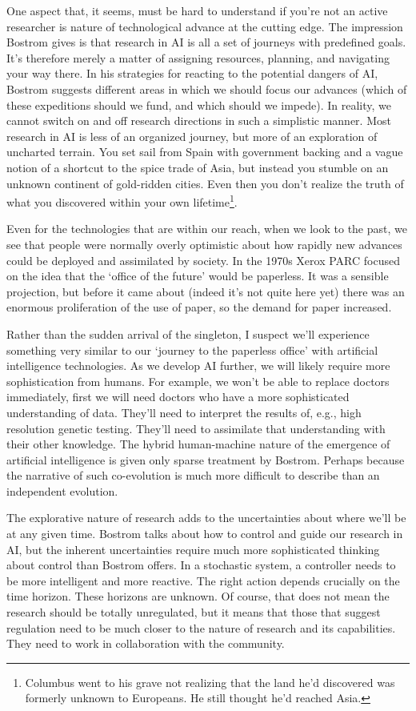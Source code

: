 \documentclass[a4paper]{caesar_book}
\begin{document}
One aspect that, it seems, must be hard to understand if you’re not an active researcher is nature of technological advance at the cutting edge. The impression Bostrom gives is that research in AI is all a set of journeys with predefined goals. It’s therefore merely a matter of assigning resources, planning, and navigating your way there. In his strategies for reacting to the potential dangers of AI, Bostrom suggests different areas in which we should focus our advances (which of these expeditions should we fund, and which should we impede). In reality, we cannot switch on and off research directions in such a simplistic manner. Most research in AI is less of an organized journey, but more of an exploration of uncharted terrain. You set sail from Spain with government backing and a vague notion of a shortcut to the spice trade of Asia, but instead you stumble on an unknown continent of gold-ridden cities. Even then you don’t realize the truth of what you discovered within your own lifetime\footnote{Columbus went to his grave not realizing that the land he’d discovered was formerly unknown to Europeans. He still thought he’d reached Asia.}.

Even for the technologies that are within our reach, when we look to the past, we see that people were normally overly optimistic about how rapidly new advances could be deployed and assimilated by society. In the 1970s Xerox PARC focused on the idea that the ‘office of the future’ would be paperless. It was a sensible projection, but before it came about (indeed it’s not quite here yet) there was an enormous proliferation of the use of paper, so the demand for paper increased.

Rather than the sudden arrival of the singleton, I suspect we’ll experience something very similar to our ‘journey to the paperless office’ with artificial intelligence technologies. As we develop AI further, we will likely require more sophistication from humans. For example, we won’t be able to replace doctors immediately, first we will need doctors who have a more sophisticated understanding of data. They’ll need to interpret the results of, e.g., high resolution genetic testing. They’ll need to assimilate that understanding with their other knowledge. The hybrid human-machine nature of the emergence of artificial intelligence is given only sparse treatment by Bostrom. Perhaps because the narrative of such co-evolution is much more difficult to describe than an independent evolution.

The explorative nature of research adds to the uncertainties about where we’ll be at any given time. Bostrom talks about how to control and guide our research in AI, but the inherent uncertainties require much more sophisticated thinking about control than Bostrom offers. In a stochastic system, a controller needs to be more intelligent and more reactive. The right action depends crucially on the time horizon. These horizons are unknown. Of course, that does not mean the research should be totally unregulated, but it means that those that suggest regulation need to be much closer to the nature of research and its capabilities. They need to work in collaboration with the community.
\end{document}
